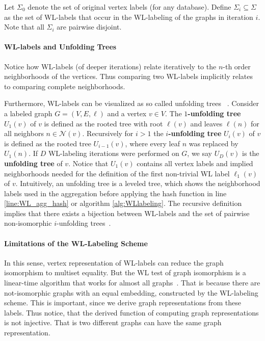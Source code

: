 		Let $\Sigma_0$ denote the set of original vertex labels (for any database).
		Define $\Sigma_i \subseteq \Sigma$ as the set of WL-labels that occur in the WL-labeling of the graphs in iteration $i$.
		Note that all $\Sigma_i$ are pairwise disjoint.
		
		\paragraph{WL-labels and Unfolding Trees}
		Notice how WL-labels (of deeper iterations) relate iteratively to the $n$-th order neighborhoods of the vertices.
		Thus comparing two WL-labels implicitly relates to comparing complete neighborhoods.
		
		Furthermore, WL-labels can be visualized as so called unfolding trees ~\cite{2021_Schulz_CONF}.
		Consider a labeled graph $G=(V,E, \ell)$ and a vertex $v\in V$.
		The $1$\textbf{-unfolding tree} $U_1(v)$ of $v$ is defined as the rooted tree with root $\ell(v)$ and leaves $\ell(n)$ for all neighbors $n\in\mathcal{N}(v)$.
		Recursively for $i>1$ the $i$\textbf{-unfolding tree} $U_i(v)$ of $v$ is defined as the rooted tree $U_{i-1}(v)$, where every leaf $n$ was replaced by $U_1(n)$.
		If $D$ WL-labeling iterations were performed on $G$, we say $U_D(v)$ is the \textbf{unfolding tree} of $v$.		
		Notice that $U_1(v)$ contains all vertex labels and implied neighborhoods needed for the definition of the first non-trivial WL label $\ell_1(v)$ of $v$.
		Intuitively, an unfolding tree is a leveled tree, which shows the neighborhood labels used in the aggregation before applying the hash function in line \ref{line:WL_agg_hash} or algorithm \ref{alg:WLlabeling}.
		The recursive definition implies that there exists a bijection between WL-labels and the set of pairwise non-isomorphic $i$-unfolding trees~\cite{2021_Schulz_CONF}.
		
		\paragraph{Limitations of the WL-Labeling Scheme}
		In this sense, vertex representation of WL-labels can reduce the graph isomorphism to multiset equality.
		But the WL test of graph isomorphism is a linear-time algorithm that works for almost all graphs~\cite{1979_Babai_CONF, 1992_Cai_IEEE}.
		That is because there are not-isomorphic graphs with an equal embedding, constructed by the WL-labeling scheme.
		This is important, since we derive graph representations from these labels. 
		Thus notice, that the derived function of computing graph representations is not injective.
		That is two different graphs can have the same graph representation.
		
